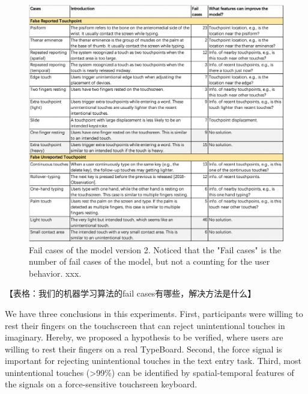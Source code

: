 \begin{figure}[!tbh]
	\includegraphics[width=1.0\linewidth]{figures/fail_cases.png}
	\centering
	\caption{Fail cases of the model version 2. Noticed that the "Fail cases" is the number of fail cases of the model, but not a counting for the user behavior. xxx.}
	\label{fig:fail_cases}
\end{figure}

【表格：我们的机器学习算法的fail cases有哪些，解决方法是什么】

We have three conclusions in this experiments. First, participants were willing to rest their fingers on the touchscreen that can reject unintentional touches in imaginary. Hereby, we proposed a hypothesis to be verified, where users are willing to rest their fingers on a real TypeBoard. Second, the force signal is important for rejecting unintentional touches in the text entry task. Third, most unintentional touches (>99\%) can be identified by spatial-temporal features of the signals on a force-sensitive touchsreen keyboard.


